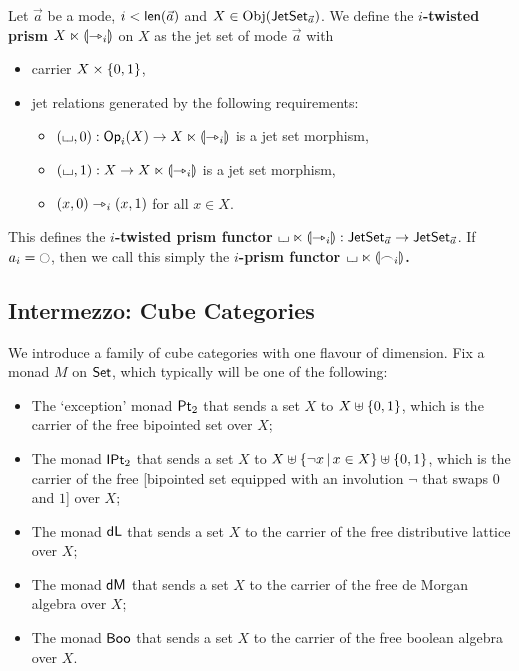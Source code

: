 \documentclass[a4paper]{article}
\begin{document}
\begin{definition} \label{def:prism}
	Let $\vec a$ be a mode, $i < \mathsf{len}(\vec a)$ and $X \in \mathrm{Obj}(\mathsf{JetSet}_{\vec a})$.
	We define the \textbf{$i$-twisted prism $X \ltimes {\llparenthesis \rightarrowtriangle_i \rrparenthesis}$} on $X$ as the jet set of mode $\vec a$ with
	\begin{itemize}
		\item carrier $X \times \mathopen{}\left\{ 0, 1 \right\}\mathclose{}$,
		\item jet relations generated by the following requirements:
		\begin{itemize}
			\item $({\llcorner\hspace{-.4ex}\lrcorner}, 0) : {\mathsf{Op}}_i(X) \to X \ltimes {\llparenthesis \rightarrowtriangle_i \rrparenthesis}$ is a jet set morphism,
			\item $({\llcorner\hspace{-.4ex}\lrcorner}, 1) : X \to X \ltimes {\llparenthesis \rightarrowtriangle_i \rrparenthesis}$ is a jet set morphism,
			\item $(x, 0) \rightarrowtriangle_i (x, 1)$ for all $x \in X$.
		\end{itemize}
	\end{itemize}
	This defines the \textbf{$i$-twisted prism functor} ${\llcorner\hspace{-.4ex}\lrcorner} \ltimes {\llparenthesis \rightarrowtriangle_i \rrparenthesis} : \mathsf{JetSet}_{\vec a} \to \mathsf{JetSet}_{\vec a}$.
	If $a_i = \npolar$, then we call this simply the \textbf{$i$-prism functor ${\llcorner\hspace{-.4ex}\lrcorner} \ltimes {\llparenthesis \frown_i \rrparenthesis}$.}
\end{definition}

\subsection{Intermezzo: Cube Categories}
We introduce a family of cube categories with one flavour of dimension. Fix a monad $M$ on ${\mathsf{Set}}$, which typically will be one of the following:
\begin{itemize}
	\item The `exception' monad ${\mathsf{Pt}_2}$ that sends a set $X$ to $X \uplus \mathopen{}\left\{ 0,1 \right\}\mathclose{}$, which is the carrier of the free bipointed set over $X$;
	\item The monad ${\mathsf{IPt}_2}$ that sends a set $X$ to $X \uplus \mathopen{}\left\{ \lnot x \,\middle|\, x \in X \right\}\mathclose{} \uplus \mathopen{}\left\{ 0, 1 \right\}\mathclose{}$, which is the carrier of the free [bipointed set equipped with an involution $\lnot$ that swaps $0$ and $1$] over $X$;
	\item The monad $\mathsf{dL}$ that sends a set $X$ to the carrier of the free distributive lattice over $X$;
	\item The monad $\mathsf{dM}$ that sends a set $X$ to the carrier of the free de Morgan algebra over $X$;
	\item The monad $\mathsf{Boo}$ that sends a set $X$ to the carrier of the free boolean algebra over $X$.
\end{itemize}
\end{document}
